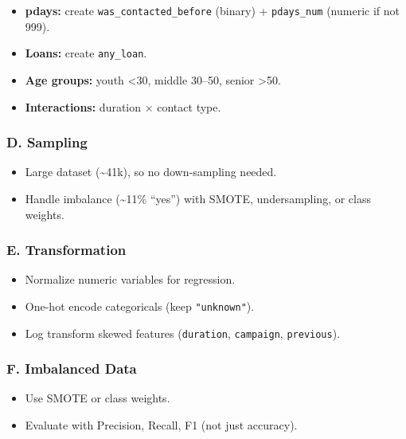 \documentclass[
]{article}
\providecommand{\tightlist}{%
  \setlength{\itemsep}{0pt}\setlength{\parskip}{0pt}}
\begin{document}
\begin{itemize}
\tightlist
\item
  \textbf{pdays:} create \texttt{was\_contacted\_before} (binary) +
  \texttt{pdays\_num} (numeric if not 999).\\
\item
  \textbf{Loans:} create \texttt{any\_loan}.\\
\item
  \textbf{Age groups:} youth \textless30, middle 30--50, senior
  \textgreater50.\\
\item
  \textbf{Interactions:} duration × contact type.
\end{itemize}

\subsubsection{D. Sampling}\label{d.-sampling}

\begin{itemize}
\tightlist
\item
  Large dataset (\textasciitilde41k), so no down-sampling needed.\\
\item
  Handle imbalance (\textasciitilde11\% ``yes'') with SMOTE,
  undersampling, or class weights.
\end{itemize}

\subsubsection{E. Transformation}\label{e.-transformation}

\begin{itemize}
\tightlist
\item
  Normalize numeric variables for regression.\\
\item
  One-hot encode categoricals (keep \texttt{"unknown"}).\\
\item
  Log transform skewed features (\texttt{duration}, \texttt{campaign},
  \texttt{previous}).
\end{itemize}

\subsubsection{F. Imbalanced Data}\label{f.-imbalanced-data}

\begin{itemize}
\tightlist
\item
  Use SMOTE or class weights.\\
\item
  Evaluate with Precision, Recall, F1 (not just accuracy).
\end{itemize}
\end{document}
